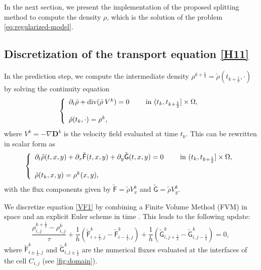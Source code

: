 \documentclass[final,reqno]{amsart}
\theoremstyle{plain}
\theoremstyle{definition}
\theoremstyle{remark}
\numberwithin{remark}{section}	%
\numberwithin{example}{section}	%
\DeclareMathOperator{\dive}{div}
\newcommand{\de}{\mathbf{D}}
\newcommand{\FF}{\mathsf{F}}
\newcommand{\GG}{\mathsf{G}}
\begin{document}
In the next section, we present the implementation of the proposed splitting method to compute the density $\rho$, which is the solution of the problem \eqref{eq:regularized-model}. \\
\subsection{Discretization of the transport equation \eqref{H11}}
In the prediction step, we compute the intermediate density $\rho^{k+\frac{1}{2}} = \tilde{\rho}(t_{k+\frac{1}{2}}, \cdot)$ by solving the continuity equation
\begin{equation}
	\left\{
	\begin{array}{ll}
		\partial_t\tilde{\rho} + \dive(\tilde{\rho}\: V^k )=0\quad & \hbox{ in } (t_k, t_{k+\frac{1}{2}}] \times \Omega, \\  \\
		\tilde{\rho}(t_{k}, \cdot)=\rho^k,
	\end{array}
	\right.
\end{equation}
where $V^k = -\nabla \de^k$ is the velocity field evaluated at time $t_k$. This can be rewritten in scalar form as 	
\begin{equation} \label{VF1}
	\left\{
	\begin{array}{ll}
		\partial_t\tilde{\rho}(t,x,y) + \partial_x \tilde{\FF}(t,x,y) + \partial_y \tilde{\GG}(t,x,y)=0\quad & \hbox{ in } (t_k, t_{k+\frac{1}{2}}] \times \Omega, \\   \\
		\tilde{\rho}(t_{k}, x, y)=\rho^k(x, y),
	\end{array}
	\right.
\end{equation}
with the flux components given by $\tilde{\FF} = \tilde{\rho} V^k_x$ and $\tilde{\GG} = \tilde{\rho} V^k_y$.

We discretize equation \eqref{VF1} by combining a Finite Volume Method (FVM) in space and an explicit Euler scheme in time \cite{finitevolumeGallouet}. This leads to the following update:
\begin{equation*}
	\frac{\rho_{i,j}^{k+\frac{1}{2}}-\rho_{i,j}^{k}}{\tau} + \frac{1}{h} \left(\tilde{\FF}^k_{i+\frac{1}{2},j}-\tilde{\FF}^k_{i-\frac{1}{2},j}\right) + \frac{1}{h} \left(\tilde{\GG}^k_{i,j+\frac{1}{2}}-\tilde{\GG}^k_{i,j-\frac{1}{2}}\right)=0,
\end{equation*}
where $\tilde{\FF}^k_{i\pm\frac{1}{2},j}$ and $\tilde{\GG}^k_{i,j\pm\frac{1}{2}}$ are the numerical fluxes evaluated at the interfaces of the cell $C_{i,j}$ (see \cref{fig:domain}). 
\end{document}
